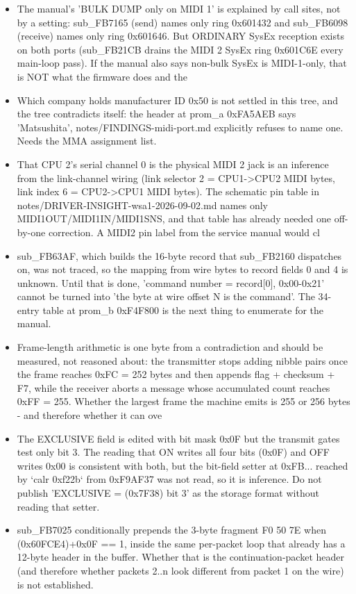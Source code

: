 \begin{itemize}
\item The manual's 'BULK DUMP only on MIDI 1' is explained by call sites, not by a setting: sub\_FB7165 (send) names only ring 0x601432 and sub\_FB6098 (receive) names only ring 0x601646. But ORDINARY SysEx reception exists on both ports (sub\_FB21CB drains the MIDI 2 SysEx ring 0x601C6E every main-loop pass). If the manual also says non-bulk SysEx is MIDI-1-only, that is NOT what the firmware does and the
\item Which company holds manufacturer ID 0x50 is not settled in this tree, and the tree contradicts itself: the header at prom\_a 0xFA5AEB says 'Matsushita', notes/FINDINGS-midi-port.md explicitly refuses to name one. Needs the MMA assignment list.
\item That CPU 2's serial channel 0 is the physical MIDI 2 jack is an inference from the link-channel wiring (link selector 2 = CPU1->CPU2 MIDI bytes, link index 6 = CPU2->CPU1 MIDI bytes). The schematic pin table in notes/DRIVER-INSIGHT-wsa1-2026-09-02.md names only MIDI1OUT/MIDI1IN/MIDI1SNS, and that table has already needed one off-by-one correction. A MIDI2 pin label from the service manual would cl
\item sub\_FB63AF, which builds the 16-byte record that sub\_FB2160 dispatches on, was not traced, so the mapping from wire bytes to record fields 0 and 4 is unknown. Until that is done, 'command number = record[0], 0x00-0x21' cannot be turned into 'the byte at wire offset N is the command'. The 34-entry table at prom\_b 0xF4F800 is the next thing to enumerate for the manual.
\item Frame-length arithmetic is one byte from a contradiction and should be measured, not reasoned about: the transmitter stops adding nibble pairs once the frame reaches 0xFC = 252 bytes and then appends flag + checksum + F7, while the receiver aborts a message whose accumulated count reaches 0xFF = 255. Whether the largest frame the machine emits is 255 or 256 bytes - and therefore whether it can ove
\item The EXCLUSIVE field is edited with bit mask 0x0F but the transmit gates test only bit 3. The reading that ON writes all four bits (0x0F) and OFF writes 0x00 is consistent with both, but the bit-field setter at 0xFB... reached by `calr 0xf22b` from 0xF9AF37 was not read, so it is inference. Do not publish 'EXCLUSIVE = (0x7F38) bit 3' as the storage format without reading that setter.
\item sub\_FB7025 conditionally prepends the 3-byte fragment F0 50 7E when (0x60FCE4)+0x0F == 1, inside the same per-packet loop that already has a 12-byte header in the buffer. Whether that is the continuation-packet header (and therefore whether packets 2..n look different from packet 1 on the wire) is not established.

\end{itemize}
